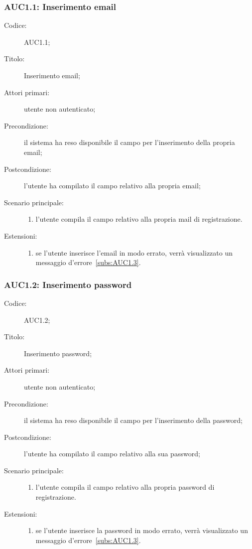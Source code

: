 \documentclass[../../../analisi-dei-requisiti.tex]{subfiles}
\begin{document}
\subsubsection{AUC1.1: Inserimento email}%
\label{subs:AUC1.1}
\begin{description}
  \item[Codice:] AUC1.1;
  \item[Titolo:] Inserimento email;
  \item[Attori primari:] utente non autenticato;
  \item[Precondizione:] il sistema ha reso disponibile il campo per l'inserimento della propria email;
  \item[Postcondizione:] l'utente ha compilato il campo relativo alla propria email;
  \item[Scenario principale:]
  \begin{enumerate}
    \item l'utente compila il campo relativo alla propria mail di registrazione.
  \end{enumerate}
  \item[Estensioni:]
  \begin{enumerate}
    \item se l'utente inserisce l'email in modo errato, verrà visualizzato un messaggio d'errore~\ref{subs:AUC1.3}.
  \end{enumerate}
\end{description}

\subsubsection{AUC1.2: Inserimento password}%
\label{subs:AUC1.2}
\begin{description}
  \item[Codice:] AUC1.2;
  \item[Titolo:] Inserimento password;
  \item[Attori primari:] utente non autenticato;
  \item[Precondizione:] il sistema ha reso disponibile il campo per l'inserimento della password;
  \item[Postcondizione:] l'utente ha compilato il campo relativo alla sua password;
  \item[Scenario principale:]
  \begin{enumerate}
    \item l'utente compila il campo relativo alla propria password di registrazione.
  \end{enumerate}
  \item[Estensioni:]
  \begin{enumerate}
    \item se l'utente inserisce la password in modo errato, verrà visualizzato un messaggio d'errore~\ref{subs:AUC1.3}.
  \end{enumerate}
\end{description}
\end{document}
